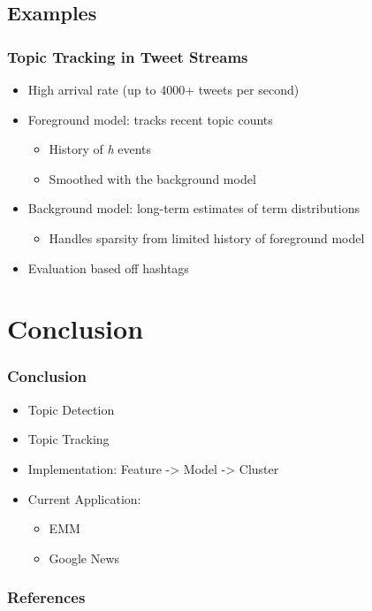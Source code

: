 \documentclass{beamer}
\begin{document}
\subsection{Examples}
\begin{frame}
	\frametitle{Topic Tracking in Tweet Streams \cite{Lin:2011:STA:2020408.2020476}}
	\begin{itemize}
		\item High arrival rate (up to 4000+ tweets per second)
		\item Foreground model: tracks recent topic counts
			\begin{itemize}
				\item History of \emph{h} events
				\item Smoothed with the background model
			\end{itemize}
		\item Background model: long-term estimates of term distributions
			\begin{itemize}
				\item Handles sparsity from limited history of foreground model
			\end{itemize}
		\item Evaluation based off hashtags
	\end{itemize}
\end{frame}

\section{Conclusion}
\begin{frame}
	\frametitle{Conclusion}
	\begin{itemize}
		\item Topic Detection
		\item Topic Tracking
		\item Implementation: Feature -> Model -> Cluster
		\item Current Application:
			\begin{itemize}
				\item EMM
				\item Google News
			\end{itemize}
	\end{itemize}
\end{frame}

\begin{frame}
	\frametitle{References}
	
	
\end{frame}
\end{document}
